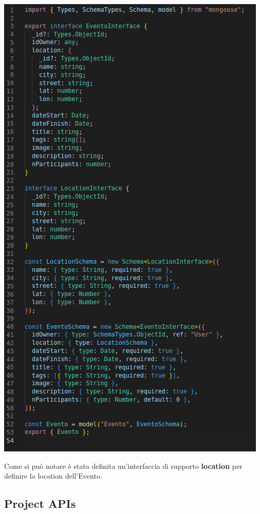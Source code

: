 \documentclass{article}
\begin{document}
\begin{description}
\begin{center}
            \includegraphics[scale=0.5]{EventoInterface.png}
        \end{center}
    \item[] Come si può notare è stata definita un'interfaccia di supporto \textbf{location} per definire la location dell'Evento.
\end{description}
\clearpage
\subsection{Project APIs}
\end{document}
